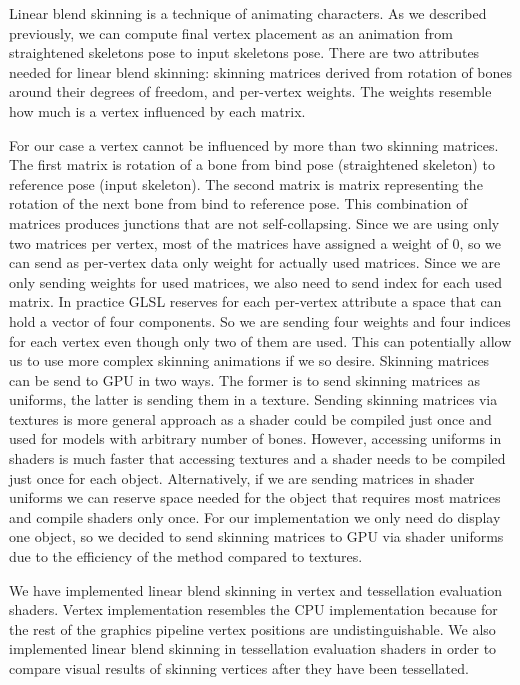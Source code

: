Linear blend skinning is a technique of animating characters.
As we described previously, we can compute final vertex placement as an animation from straightened skeletons pose to input skeletons pose.
There are two attributes needed for linear blend skinning: skinning matrices derived from rotation of bones around their degrees of freedom, and per-vertex weights.
The weights resemble how much is a vertex influenced by each matrix.

For our case a vertex cannot be influenced by more than two skinning matrices.
The first matrix is rotation of a bone from bind pose (straightened skeleton) to reference pose (input skeleton).
The second matrix is matrix representing the rotation of the next bone from bind to reference pose.
This combination of matrices produces junctions that are not self-collapsing.
Since we are using only two matrices per vertex, most of the matrices have assigned a weight of 0, so we can send as per-vertex data only weight for actually used matrices.
Since we are only sending weights for used matrices, we also need to send index for each used matrix.
In practice GLSL reserves for each per-vertex attribute a space that can hold a vector of four components.
So we are sending four weights and four indices for each vertex even though only two of them are used.
This can potentially allow us to use more complex skinning animations if we so desire.
Skinning matrices can be send to GPU in two ways.
The former is to send skinning matrices as uniforms, the latter is sending them in a texture.
Sending skinning matrices via textures is more general approach as a shader could be compiled just once and used for models with arbitrary number of bones.
However, accessing uniforms in shaders is much faster that accessing textures and a shader needs to be compiled just once for each object.
Alternatively, if we are sending matrices in shader uniforms we can reserve space needed for the object that requires most matrices and compile shaders only once.
For our implementation we only need do display one object, so we decided to send skinning matrices to GPU via shader uniforms due to the efficiency of the method compared to textures.

We have implemented linear blend skinning in vertex and tessellation evaluation shaders.
Vertex implementation resembles the CPU implementation because for the rest of the graphics pipeline vertex positions are undistinguishable.
We also implemented linear blend skinning in tessellation evaluation shaders in order to compare visual results of skinning vertices after they have been tessellated.

